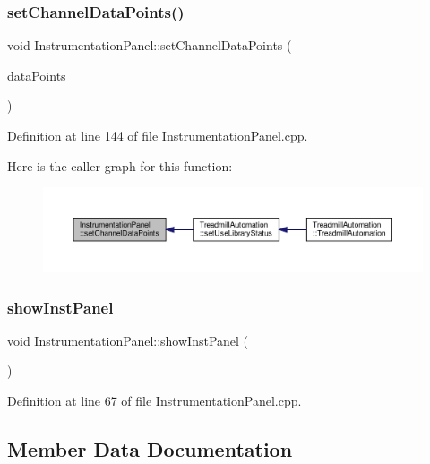 \subsubsection{\texorpdfstring{set\+Channel\+Data\+Points()}{setChannelDataPoints()}}
{\footnotesize\ttfamily void Instrumentation\+Panel\+::set\+Channel\+Data\+Points (\begin{DoxyParamCaption}\item[{Q\+Map$<$ int, Q\+Vector$<$ double $>$$>$}]{data\+Points }\end{DoxyParamCaption})}



Definition at line 144 of file Instrumentation\+Panel.\+cpp.

Here is the caller graph for this function\+:
\nopagebreak
\begin{figure}[H]
\begin{center}
\leavevmode
\includegraphics[width=350pt]{class_instrumentation_panel_a509148700ac0a6cba91d15905a54bde2_icgraph}
\end{center}
\end{figure}
\mbox{\label{class_instrumentation_panel_af4f34c31b21bbf3363cf3e2c915e28bf}} 
\subsubsection{\texorpdfstring{show\+Inst\+Panel}{showInstPanel}}
{\footnotesize\ttfamily void Instrumentation\+Panel\+::show\+Inst\+Panel (\begin{DoxyParamCaption}{ }\end{DoxyParamCaption})\hspace{0.3cm}{\ttfamily [slot]}}



Definition at line 67 of file Instrumentation\+Panel.\+cpp.



\subsection{Member Data Documentation}
\mbox{\label{class_instrumentation_panel_a1c25236fcbeec52d97dd350c942f0f93}} 
